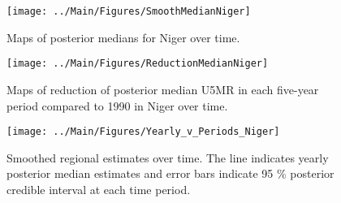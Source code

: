 \documentclass[12pt]{article}\usepackage[]{graphicx}\usepackage[]{color}
\newenvironment{knitrout}{}{} %
\begin{document}
\begin{knitrout}
\color{fgcolor}\begin{figure}[bht]

{\centering \texttt{[image: ../Main/Figures/SmoothMedianNiger]} 

}

\caption[Maps of posterior medians for Niger  over time]{Maps of posterior medians for Niger  over time.}\label{fig:unnamed-chunk-254}
\end{figure}


\end{knitrout}
\begin{knitrout}
\color{fgcolor}\begin{figure}[bht]

{\centering \texttt{[image: ../Main/Figures/ReductionMedianNiger]} 

}

\caption[Maps of reduction of posterior median U5MR in each five-year period compared to 1990 in Niger over time]{Maps of reduction of posterior median U5MR in each five-year period compared to 1990 in Niger over time.}\label{fig:unnamed-chunk-255}
\end{figure}


\end{knitrout}
\begin{knitrout}
\color{fgcolor}\begin{figure}[bht]

{\centering \texttt{[image: ../Main/Figures/Yearly\_v\_Periods\_Niger]} 

}

\caption[Smoothed regional estimates over time]{Smoothed regional estimates over time. The line indicates yearly posterior median estimates and error bars indicate 95 \% posterior credible interval at each time period.}\label{fig:unnamed-chunk-256}
\end{figure}


\end{knitrout}
\end{document}

